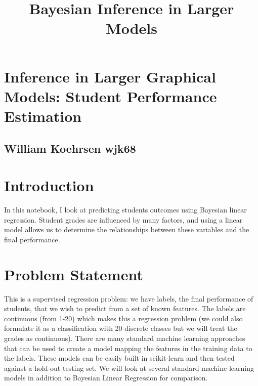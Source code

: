 \documentclass[11pt]{article}
\title{Bayesian Inference in Larger Models}
\begin{document}
    
    
    \maketitle
    
    

    
    \hypertarget{inference-in-larger-graphical-models-student-performance-estimation}{%
\section{Inference in Larger Graphical Models: Student Performance
Estimation}\label{inference-in-larger-graphical-models-student-performance-estimation}}

\hypertarget{william-koehrsen-wjk68}{%
\subsection{William Koehrsen wjk68}\label{william-koehrsen-wjk68}}

    \hypertarget{introduction}{%
\section{Introduction}\label{introduction}}

In this notebook, I look at predicting students outcomes using Bayesian
linear regression. Student grades are influenced by many factors, and
using a linear model allows us to determine the relationships between
these variables and the final performance.

\hypertarget{problem-statement}{%
\section{Problem Statement}\label{problem-statement}}

This is a supervised regression problem: we have labels, the final
performance of students, that we wish to predict from a set of known
features. The labels are continuous (from 1-20) which makes this a
regression problem (we could also formulate it as a classification with
20 discrete classes but we will treat the grades as continuous). There
are many standard machine learning approaches that can be used to create
a model mapping the features in the training data to the labels. These
models can be easily built in scikit-learn and then tested against a
hold-out testing set. We will look at several standard machine learning
models in addition to Bayesian Linear Regression for comparison.
\end{document}
